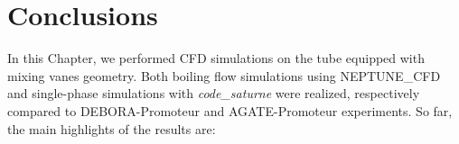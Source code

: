 %
%
%
%
%



\section{Conclusions}

In this Chapter, we performed CFD simulations on the tube equipped with mixing vanes geometry. Both boiling flow simulations using NEPTUNE\_CFD and single-phase simulations with \textit{code\_saturne} were realized, respectively compared to DEBORA-Promoteur and AGATE-Promoteur experiments. So far, the main highlights of the results are:

